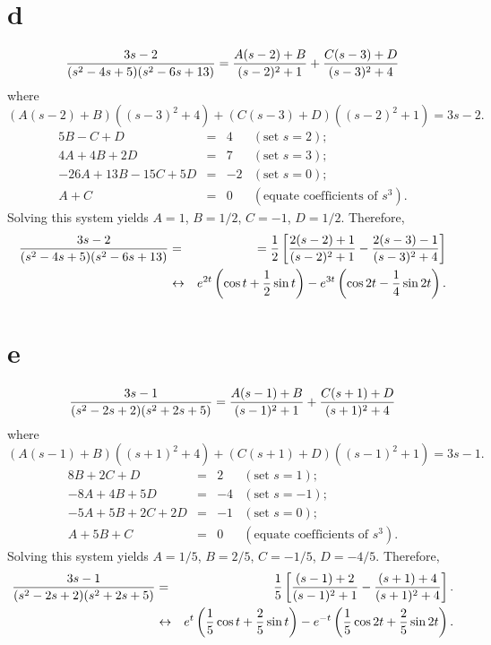\documentclass[dvips]{book}
\numberwithin{example}{section}
\numberwithin{equation}{section}
\numberwithin{theorem}{section}
\numberwithin{table}{section}
\numberwithin{figure}{section}
\begin{document}
\part{d}
$${3s-2\over(s^2-4s+5)(s^2-6s+13)}
={A(s-2)+B\over(s-2)^2+1}+{C(s-3)+D\over(s-3)^2+4}
$$
where
$$
(A(s-2)+B)((s-3)^2+4)+(C(s-3)+D)((s-2)^2+1)=3s-2.
$$
$$
\begin{array}{rcrl}
5B-C+D&=&4&(\mbox{set }s=2);\\
4A+4B+2D&=&7& (\mbox{set }s=3);\\
-26A+13B-15C+5D&=&-2&(\mbox{set }s=0);\\
A+C&=&0&(\mbox{equate coefficients of }s^3).
\end{array}
$$
Solving this system yields $A=1$, $B=1/2$,
$C=-1$, $D=1/2$. Therefore,
\begin{eqnarray*}
{3s-2\over(s^2-4s+5)(s^2-6s+13)}
&=&
={1\over2}\left[{2(s-2)+1\over(s-2)^2+1}-{2(s-3)-1\over(s-3)^2+4}\right]
\\&\leftrightarrow&
e^{2t}\left(\cos t+{1\over2}\sin
t\right)-e^{3t}\left(\cos 2t-{1\over4}\sin 2t\right).
\end{eqnarray*}


\part{e}
$$
{3s-1\over(s^2-2s+2)(s^2+2s+5)}
={A(s-1)+B\over(s-1)^2+1}+{C(s+1)+D\over(s+1)^2+4}
$$
where
$$
(A(s-1)+B)((s+1)^2+4)+(C(s+1)+D)((s-1)^2+1)=3s-1.
$$
$$
\begin{array}{rcrl}
8B+2C+D&=&2&(\mbox{set }s=1);\\
-8A+4B+5D&=&-4& (\mbox{set }s=-1);\\
-5A+5B+2C+2D&=&-1&(\mbox{set }s=0);\\
A+5B+C&=&0&(\mbox{equate coefficients of }s^3).
\end{array}
$$
Solving this system yields $A=1/5$, $B=2/5$,
$C=-1/5$, $D=-4/5$. Therefore,
\begin{eqnarray*}
{3s-1\over(s^2-2s+2)(s^2+2s+5)}
&=&
{1\over5}\left[{(s-1)+2\over(s-1)^2+1}-{(s+1)+4\over(s+1)^2+4}\right].
\\&\leftrightarrow&
e^t\left({1\over5}\cos t+{2\over5} \sin t\right)
-e^{-t}\left({1\over5}\cos 2t+{2\over5}\sin 2t\right).
\end{eqnarray*}
\end{document}
